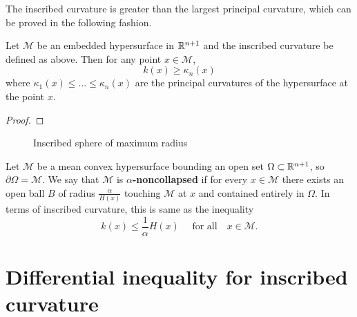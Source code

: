 The inscribed curvature is greater than the largest principal curvature, which can be proved in the following fashion. 
\begin{lemma}
    Let $ \mathcal{M} $ be an embedded hypersurface in $ \mathbb{R}^{n+1} $ and the inscribed curvature be defined as above. Then for any point $ x \in \mathcal{M} $,
    \[ k(x) \ge \kappa_{n}(x) \]
    where $ \kappa_{1}(x) \le \ldots \le \kappa_{n}(x) $ are the principal curvatures of the hypersurface at the point $ x  $.
\end{lemma}
\begin{proof}
    
\end{proof}
\begin{figure}[h]
    \centering
    \caption{Inscribed sphere of maximum radius}
\end{figure}

\begin{defn}
    Let $ \mathcal{M} $ be a mean convex hypersurface bounding an open set $ \Omega \subset \mathbb{R}^{n+1}$, so $ \partial \Omega = \mathcal{M} $. We say that $ \mathcal{M} $ is \textbf{$ \alpha $-noncollapsed}  if for every $ x \in \mathcal{M} $ there exists an open ball $ B $ of radius $ \frac{\alpha}{H(x)} $ touching $ \mathcal{M} $ at $ x $ and contained entirely in $ \Omega $. In terms of inscribed curvature, this is same as the inequality \begin{equation}
        k(x) \le \frac{1}{\alpha} H(x) \quad \text{ for all} \quad x \in \mathcal{M}.
    \end{equation}
\end{defn}


\section{Differential inequality for inscribed curvature}

